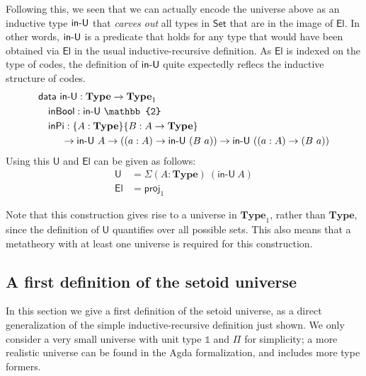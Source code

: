 \documentclass{easychair}
\newcommand{\ad}[1]{\AgdaFunction{#1}}
\newcommand{\Set}{\textsf{Set}}
\newcommand{\mType}{\mathbf{Type}}
\newcommand{\U}{\textsf{U}}
\newcommand{\El}{\textsf{El}}
\providecommand\mathbbm{\mathbb}
\begin{document}
Following this, we seen that we can actually encode the universe above as an
inductive type $\ad{in-U}$ that \emph{carves out} all types in $\Set$ that are
in the image of $\El$. In other words, $\ad{in-U}$ is a predicate that holds for
any type that would have been obtained via $\El$ in the usual
inductive-recursive definition. As $\El$ is indexed on the type of codes, the
definition of $\ad{in-U}$ quite expectedly reflecs the inductive structure of
codes.
%
\begin{align*}
  & \textsf{data}\ \ad{in-U} : \mType \to \mType_1 \\
  & \quad \textsf{inBool} : \textsf{in-U}\ \mathbbm{2} \\
  & \quad \textsf{inPi}
  :  \{A : \mType\} \{B : A \to \mType\}\\
  & \ \qquad \to \ad{in-U}\ A
  \to ((a : A) \to \ad{in-U}\ (B\ a))
  \to \ad{in-U}\ ((a : A) \to (B\ a))
\end{align*}
Using this $\U$ and $\El$ can be given as follows:
\begin{align*}
  \U & = \Sigma (A : \mType)\ (\textsf{in-U}\ A) \\
  \El & = \textsf{proj}_1
\end{align*}

Note that this construction gives rise to a universe in $\mType_1$, rather than
$\mType$, since the definition of $\U$ quantifies over all possible sets. This
also means that a metatheory with at least one universe is required for this
construction.

\subsection{A first definition of the setoid universe}

In this section we give a first definition of the setoid universe, as a direct
generalization of the simple inductive-recursive definition just shown. We only
consider a very small universe with unit type $\mathds{1}$ and $\Pi$ for
simplicity; a more realistic universe can be found in the Agda formalization,
and includes more type formers.
\end{document}
